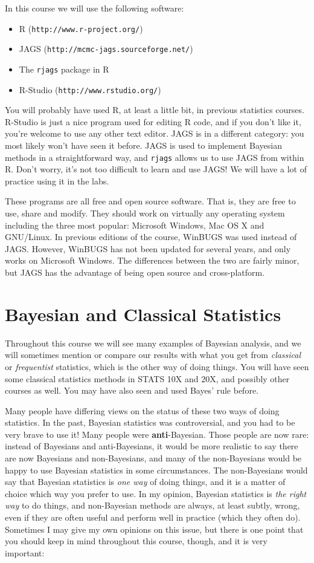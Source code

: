In this course we will use the following software:
\begin{itemize}
\item R ({\tt http://www.r-project.org/})
\item JAGS ({\tt http://mcmc-jags.sourceforge.net/})
\item The {\tt rjags} package in R
\item R-Studio ({\tt http://www.rstudio.org/})
\end{itemize}
You will probably have used R, at least a little bit, in previous statistics
courses. R-Studio is just a nice program used for editing R code, and if you
don't like it, you're welcome to use any other text editor. JAGS is in a
different category: you most likely won't have seen it before. JAGS is used to
implement Bayesian methods in a straightforward way, and {\tt rjags} allows us
to use JAGS from within R.
Don't worry, it's not too difficult to learn and use JAGS! We will have a lot of
practice using it in the labs.

These programs are all free and open source software.
That is, they are free to use, share and modify. They should work on
virtually any operating system including the three most popular:
Microsoft Windows, Mac OS X and GNU/Linux. In previous editions of the course,
WinBUGS was used instead of JAGS. However, WinBUGS has not been updated for
several years, and only works on Microsoft Windows. The differences between
the two are fairly minor, but JAGS has the advantage of being open source and
cross-platform.

\section{Bayesian and Classical Statistics}
Throughout this course we will see many examples of Bayesian analysis, and we
will sometimes mention or compare our results with what you get from
{\it classical} or {\it frequentist} statistics, which is the other way of
doing things. You will have seen some classical statistics methods in STATS
10X and 20X, and possibly other courses as well. You may have also seen and
used Bayes' rule before.

Many
people have differing views on the status of these two ways of doing statistics.
In the past, Bayesian statistics was controversial, and you had to be very
brave to use it! Many people were {\bf anti}-Bayesian. Those people are now
rare: instead of Bayesians and anti-Bayesians, it would be more realistic to
say there are now Bayesians and non-Bayesians, and many of the non-Bayesians
would be happy to use Bayesian statistics in some circumstances.
The non-Bayesians would say that
Bayesian statistics is {\it one way} of doing things, and it is a matter of
choice which way you prefer to use. In my opinion, Bayesian
statistics is {\it the right way} to do things, and non-Bayesian methods are
always, at least subtly, wrong, even if they are often useful and perform well
in practice (which
they often do). Sometimes I may give my own opinions on this issue, but
there is one point that you should keep in mind throughout
this course, though, and it is very important:

